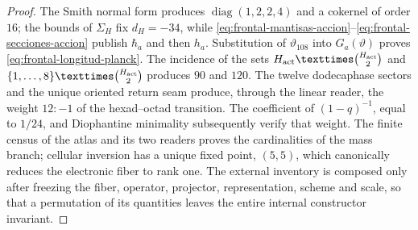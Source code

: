\begin{proof}
The Smith normal form produces
\(\operatorname{diag}(1,2,2,4)\) and a cokernel of order \(16\); the bounds of
\(\Sigma_H\) fix \(d_H=-34\), while
\eqref{eq:frontal-mantisas-accion}--\eqref{eq:frontal-secciones-accion}
publish \(\hbar_a\) and then \(h_a\). Substitution of
\(\vartheta_{108}\) into \(G_a(\vartheta)\) proves
\eqref{eq:frontal-longitud-planck}. The incidence of the sets
\(H_{\rm act}\times\binom{H_{\rm act}}2\) and
\(\{1,\ldots,8\}\times\binom{H_{\rm act}}2\) produces \(90\) and \(120\).
The twelve dodecaphase sectors and the unique oriented return seam
produce, through the linear reader, the weight \(12{:}{-}1\) of the
hexad--octad transition. The coefficient of \((1-q)^{-1}\), equal to \(1/24\), and
Diophantine minimality subsequently verify that weight. The finite census of the atlas and its two readers
proves the cardinalities of the mass branch; cellular inversion has a unique
fixed point, \((5,5)\), which canonically reduces the electronic fiber to rank
one. The external inventory is composed only after freezing the fiber,
operator, projector, representation, scheme and scale, so that a
permutation of its quantities leaves the entire internal constructor invariant.
\end{proof}
